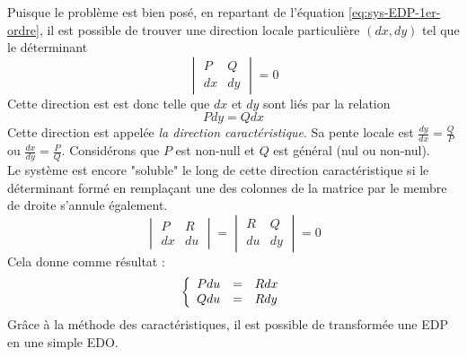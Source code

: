 Puisque le problème est bien posé, en repartant de l'équation \ref{eq:sys-EDP-1er-ordre}, il est possible de trouver une direction locale particulière $(dx,dy)$ tel que le déterminant 
\begin{equation}
\begin{vmatrix}
P & Q \\
dx & dy
\end{vmatrix}
=0
\end{equation}
Cette direction est est donc telle que $dx$ et $dy$ sont liés par la relation
\begin{equation}
P dy = Q dx
\label{eq:relation-direction-cara-1er-ordre}
\end{equation}
Cette direction est appelée \emph{la direction caractéristique}. Sa pente locale est $\frac{dy}{dx}=\frac{Q}{P}$ ou $\frac{dx}{dy}=\frac{P}{Q}$. Considérons que $P$ est non-null et $Q$ est général (nul ou non-nul).\\
Le système est encore "soluble" le long de cette direction caractéristique si le déterminant formé en remplaçant une des colonnes de la matrice par le membre de droite s'annule également.
\begin{equation}
\begin{vmatrix}
P & R \\
dx & du
\end{vmatrix}
=
\begin{vmatrix}
R & Q \\
du & dy
\end{vmatrix}
= 0
\end{equation} 
Cela donne comme résultat : 
\begin{equation}
\left\{
\begin{array}{r c l}
P du &=&R dx \\
Q du &=&R dy
\end{array}
\right.
\end{equation}
Grâce à la méthode des caractéristiques, il est possible de transformée une EDP en une simple EDO.\\
